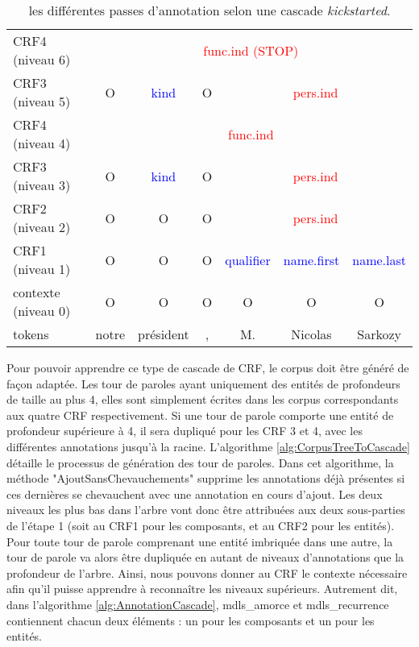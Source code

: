 \documentclass[PhD-Yoann-Dupont.tex]{subfiles}
\begin{document}
\begin{table}[ht!]
    \centering
    \begin{tabular}{|l|cccccc|}
    \hline
    \cline{2-7}
    CRF4 (niveau 6)     & \multicolumn{6}{c|}{\textcolor{red}{func.ind (STOP)}} \\
    \cline{2-7}
    CRF3 (niveau 5)     & O & \multicolumn{1}{|c|}{\textcolor{blue}{kind}} & O & \multicolumn{3}{|c|}{\textcolor{red}{pers.ind}} \\
    \cline{2-7}
    CRF4 (niveau 4)     & \multicolumn{6}{c|}{\textcolor{red}{func.ind}} \\
    \cline{2-7}
    CRF3 (niveau 3)     & O & \multicolumn{1}{|c|}{\textcolor{blue}{kind}} & O & \multicolumn{3}{|c|}{\textcolor{red}{pers.ind}} \\
    \cline{3-3}\cline{5-7}
    CRF2 (niveau 2)     & O & O & O & \multicolumn{3}{|c|}{\textcolor{red}{pers.ind}} \\
    \cline{5-7}
    CRF1 (niveau 1)     & O & O & O & \multicolumn{1}{|c|}{\textcolor{blue}{qualifier}} & \multicolumn{1}{c|}{\textcolor{blue}{name.first}} & \multicolumn{1}{c|}{\textcolor{blue}{name.last}} \\
    \cline{5-7}
    contexte (niveau 0) & O & O & O & O & O & O \\
    \hline
    tokens                & notre & président & , & M. & Nicolas & Sarkozy \\
    \hline
    \end{tabular}
    \caption{les différentes passes d'annotation selon une cascade \textit{kickstarted}.}
    \label{tab:kickstart-annotations}
\end{table}

Pour pouvoir apprendre ce type de cascade de CRF, le corpus doit être généré de façon adaptée. Les tour de paroles ayant uniquement des entités de profondeurs de taille au plus 4, elles sont simplement écrites dans les corpus correspondants aux quatre CRF respectivement. Si une tour de parole comporte une entité de profondeur supérieure à 4, il sera dupliqué pour les CRF 3 et 4, avec les différentes annotations jusqu'à la racine. L'algorithme \ref{alg:CorpusTreeToCascade} détaille le processus de génération des tour de paroles. Dans cet algorithme, la méthode "AjoutSansChevauchements" supprime les annotations déjà présentes si ces dernières se chevauchent avec une annotation en cours d'ajout. Les deux niveaux les plus bas dans l'arbre vont donc être attribuées aux deux sous-parties de l'étape 1 (soit au CRF1 pour les composants, et au CRF2 pour les entités). Pour toute tour de parole comprenant une entité imbriquée dans une autre, la tour de parole va alors être dupliquée en autant de niveaux d'annotations que la profondeur de l'arbre. Ainsi, nous pouvons donner au CRF le contexte nécessaire afin qu'il puisse apprendre à reconnaître les niveaux supérieurs. Autrement dit, dans l'algorithme \ref{alg:AnnotationCascade}, mdls\_amorce et mdls\_recurrence contiennent chacun deux éléments : un pour les composants et un pour les entités.
\end{document}
